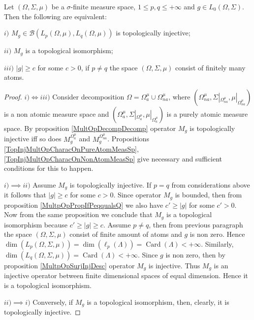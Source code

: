 \begin{proposition}\label{TopInjMultOpCharacOnMeasSp} Let $(\Omega,\Sigma,\mu)$ be a $\sigma$-finite measure space, $1\leq p,q\leq +\infty$ and $g\in L_0(\Omega,\Sigma)$. Then the following are equivalent:

$i)$ $M_g\in\mathcal{B}(L_p(\Omega,\mu),L_q(\Omega,\mu))$ is topologically injective;

$ii)$ $M_g$ is a topological isomorphism;

$iii)$ $|g|\geq c$ for some $c>0$, if $p\neq q$ the space $(\Omega,\Sigma,\mu)$ consist of finitely many atoms.
\end{proposition}
\begin{proof} $i)\Longleftrightarrow iii)$ Consider decomposition
$\Omega=\Omega_a^{\mu}\cup\Omega_{na}^{\mu}$, where $(\Omega_{na}^{\mu},\Sigma|_{\Omega_{na}^{\mu}},\mu|_{\Omega_{na}^{\mu}})$ is a non atomic measure space and $(\Omega_a^{\mu},\Sigma|_{\Omega_a^{\mu}},\mu|_{\Omega_a^{\mu}})$ is a purely atomic measure space. By proposition \ref{MultOpDecompDecomp} operator $M_g$ is topologically injective iff so does $M_g^{\Omega_a^{\mu}}$ and $M_g^{\Omega_{na}^{\mu}}$. Propositions \ref{TopInjMultOpCharacOnPureAtomMeasSp}, \ref{TopInjMultOpCharacOnNonAtomMeasSp} give necessary and sufficient conditions for this to happen. 

$i)$$\implies$$ ii)$ Assume $M_g$ is topologically injective. If $p=q$ from considerations above it follows that $|g|\geq c$ for some $c>0$. Since operator $M_g$ is bounded, then from proposition \ref{MultpOpPropIfPeqqualsQ} we also have $c'\geq |g|$ for some $c'>0$. Now from the same proposition we conclude that $M_g$ is a topological isomorphism because $c'\geq|g|\geq c$. Assume $p\neq q$, then from previous paragraph the space $(\Omega,\Sigma,\mu)$ consist of finite amount of atoms and $g$ is non zero. Hence $\operatorname{dim}(L_p(\Omega,\Sigma,\mu))=\operatorname{dim}(\ell_p(\Lambda))=\operatorname{Card}(\Lambda)<+\infty$. Similarly, $\operatorname{dim}(L_q(\Omega,\Sigma,\mu))=\operatorname{Card}(\Lambda)<+\infty$. Since $g$ is non zero, then by proposition \ref{MultpOpSurjInjDesc} operator $M_g$ is injective. Thus $M_g$ is an injective operator between finite dimensional spaces of equal dimension. Hence it is a topological isomorphism.

$ii)$$\implies$$ i)$ Conversely, if $M_g$ is a topological isomorphism, then, clearly, it is topologically injective.
\end{proof}

